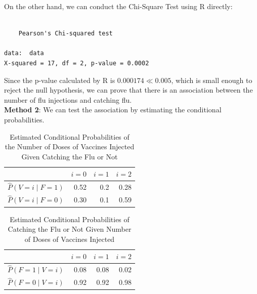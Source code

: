 \documentclass[
]{book}
\begin{document}
On the other hand, we can conduct the Chi-Square Test using R directly:

\begin{verbatim}

    Pearson's Chi-squared test

data:  data
X-squared = 17, df = 2, p-value = 0.0002
\end{verbatim}

Since the p-value calculated by R is \(0.000174 \ll 0.005\), which is small enough to reject the null hypothesis, we can prove that there is an association between the number of flu injections and catching flu.\\

\textbf{Method 2}: We can test the association by estimating the conditional probabilities.

\begin{table}

\caption{\label{tab:unnamed-chunk-15}Estimated Conditional Probabilities of the Number of Doses of Vaccines Injected Given Catching the Flu or Not}
\centering
\begin{tabular}[t]{l|r|r|r}
\hline
  & $i = 0$ & $i = 1$ & $i = 2$\\
\hline
$\hat{P}(V = i \mid F = 1)$ & 0.52 & 0.2 & 0.28\\
\hline
$\hat{P}(V = i \mid F = 0)$ & 0.30 & 0.1 & 0.59\\
\hline
\end{tabular}
\end{table}

\begin{table}

\caption{\label{tab:unnamed-chunk-15}Estimated Conditional Probabilities of Catching the Flu or Not Given Number of Doses of Vaccines Injected}
\centering
\begin{tabular}[t]{l|r|r|r}
\hline
  & $i = 0$ & $i = 1$ & $i = 2$\\
\hline
$\hat{P}(F = 1 \mid V = i)$ & 0.08 & 0.08 & 0.02\\
\hline
$\hat{P}(F = 0 \mid V = i)$ & 0.92 & 0.92 & 0.98\\
\hline
\end{tabular}
\end{table}
\end{document}
